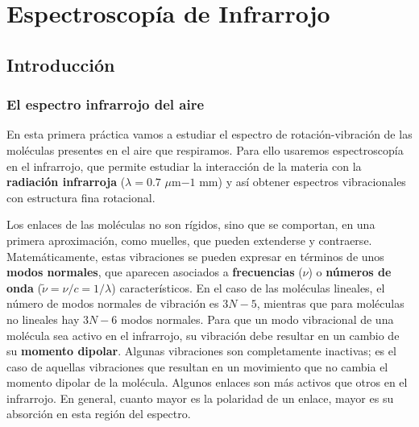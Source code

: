 \documentclass{tufte-book}
\begin{document}




\chapter[Infrarrojo]{Espectroscopía de Infrarrojo}
\section{Introducción}
\subsection{El espectro infrarrojo del aire}
En esta primera práctica vamos a estudiar el espectro de rotación-vibración
de las moléculas presentes en el aire que respiramos. Para ello usaremos
espectroscopía en el infrarrojo, que permite estudiar la interacción de la
materia con la \textbf{radiación infrarroja} ($\lambda=0.7$ $\mu$m$-1$ mm) 
y así obtener espectros vibracionales con estructura fina rotacional. 

Los enlaces de las moléculas no son rígidos, sino que se comportan,
en una primera aproximación, como muelles, que pueden extenderse y contraerse.
Matemáticamente, estas vibraciones se pueden expresar en términos de unos
\textbf{modos normales}, que aparecen asociados a \textbf{frecuencias} ($\nu$)
o \textbf{números de onda} ($\tilde{\nu}=\nu/c=1/\lambda$) característicos. 
En el 
caso de las moléculas lineales, el número de modos normales de vibración 
es $3N-5$, mientras que para moléculas no lineales hay $3N-6$ modos normales.
Para que un modo vibracional de una molécula sea activo en el infrarrojo, 
su vibración debe resultar en un cambio de su \textbf{momento dipolar}.
Algunas vibraciones son completamente inactivas; es el caso de aquellas
vibraciones que resultan en un movimiento que no cambia el momento dipolar
de la molécula. Algunos enlaces son más activos que otros en el infrarrojo. 
En general, cuanto mayor es la polaridad de un enlace, mayor es su 
absorción en esta región del espectro. 
\end{document}
